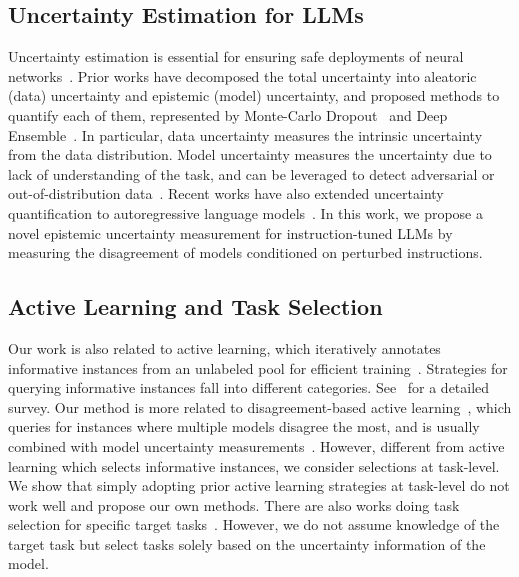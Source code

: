 \subsection{Uncertainty Estimation for LLMs}
Uncertainty estimation is essential for ensuring safe deployments of neural networks~\citep{abdar2021review}. Prior works have decomposed the total uncertainty into aleatoric (data) uncertainty and epistemic (model) uncertainty, and proposed methods to quantify each of them, represented by Monte-Carlo Dropout~\citep{gal2016dropout} and Deep Ensemble~\citep{lakshminarayanan2017simple}. In particular, data uncertainty measures the intrinsic uncertainty from the data distribution. Model uncertainty measures the uncertainty due to lack of understanding of the task, and can be leveraged to detect adversarial or out-of-distribution data~\citep{feinman2017detecting, Yin2022ADDMUDO}. Recent works have also extended uncertainty quantification to autoregressive language models~\citep{xiao2019quantifying, malinin2020uncertainty}. In this work, we propose a novel epistemic uncertainty measurement for instruction-tuned LLMs by measuring the disagreement of models conditioned on perturbed instructions.
\subsection{Active Learning and Task Selection}
Our work is also related to active learning, which iteratively annotates informative instances from an unlabeled pool for efficient training~\citep{olsson2009literature, siddhant-lipton-2018-deep, zhang-etal-2022-survey}. Strategies for querying informative instances fall into different categories. See~\citet{zhang-etal-2022-survey} for a detailed survey. Our method is more related to disagreement-based active learning~\citep{houlsby2011bayesian, siddhant-lipton-2018-deep, shen-etal-2017-deep}, which queries for instances where multiple models disagree the most, and is usually combined with model uncertainty measurements~\citep{gal2016dropout}. However, different from active learning which selects informative instances, we consider selections at task-level. We show that simply adopting prior active learning strategies at task-level do not work well and propose our own methods. There are also works doing task selection for specific target tasks~\citep{parvez-chang-2021-evaluating, zhou2023not}. However, we do not assume knowledge of the target task but select tasks solely based on the uncertainty information of the model.
